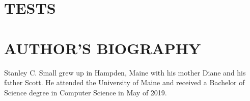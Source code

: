 \documentclass{article}
\begin{document}
\newpage
\appendix

\section{\MakeUppercase{Tests}}

\newpage
{}
\vspace*{.05in}
\section*{\MakeUppercase{Author's Biography}}
Stanley C. Small grew up in Hampden, Maine with his mother Diane and his father Scott. He attended the University of Maine and received a Bachelor of Science degree in Computer Science in May of 2019. 
\end{document}
